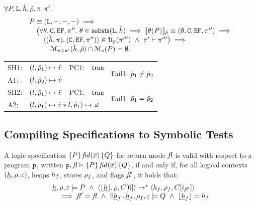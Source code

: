 \begin{theorem}
$\forall P, \existentials, \sheap, \sstore, \pc, \pc'.$
$$
\begin{array}{l}
   P \equiv (\existentials, -, -, -) \implies \\
   \quad \big( \forall \subst, \cells, \efs, \pfs''.\ \subst \in \substs(\existentials, \sheap) \implies 
   \symbeval{\subst(P)}{\sstore} \equiv (\emptyset, \cells, \efs, \pfs'') \implies \\
   \qquad \unificationfullfail{\sheap, \pc}{\cells, \efs, \pfs''}{}{\pc'''} \ \wedge \  \pc' \vdash \pfs''' \big) \implies \\
   \qquad \quad \smodels{\sheap, \sstore}{\pc \wedge \pc'} \cap \sepmodels{P} = \emptyset.   
\end{array}
$$ 
\end{theorem}


\begin{tabular}{lllll}
\textsc{SH1:} & $(\loc, \sexprp_1) \mapsto \sexprv$ & \textsc{PC1: } &  $\jtrue$ &  \multirow{2}{*}{Fail1: $\sexprp_1 \neq \sexprp_2$} \\
\textsc{A1:}    & \multicolumn{3}{l}{$(\loc, \sexprp_2) \mapsto \sexprv$}  &  \\[3pt]
%
\textsc{SH2:} & $(\loc, \sexprp_1) \mapsto \sexprv$ & \textsc{PC1: } &  $\jtrue$ &  \multirow{2}{*}{Fail1: $\sexprp_1 = \sexprp_2$} \\
\textsc{A2:}    & \multicolumn{3}{l}{$(\loc, \sexprp_1) \mapsto \sexprv \sep \loc, \sexprp_1) \mapsto \none$}  & 

\end{tabular}




\newpage
\subsection{Compiling \jsil Specifications to Symbolic Tests}
\label{specs:to:symbolic:tests}

\begin{definition}
A \jsil logic specification $\lconf{P} \, \fid(\jvec{x}) \,  \lconf{Q}$ for return mode $\flag$ is valid with respect to a program 
$\prog$, written $\prog, \flag \vDash \lconf{P} \, \fid(\jvec{x}) \,  \lconf{Q}$,  if and only if, for all logical 
contexts $(\iheap, \store, \senv)$, heaps $\heap_f$, stores $\store_f$, and flags $\flag'$, it holds that: 
$$
\begin{array}{l}
    \iheap, \store, \senv \satisfies P \ \wedge \ \tuple{\deabstract{\iheap}, \store, \ctx[0]} \rightarrow^* \tuple{\heap_f, \store_f, \ctx[i_{\flag'}]} \\
       \quad \implies
            \flag' = \flag \ \wedge \ \exists \iheap_f \, . \, \iheap_f, \store_f, \senv \satisfies Q \ \wedge \ \deabstract{\iheap_f} = \heap_f
\end{array}
$$
\end{definition}

